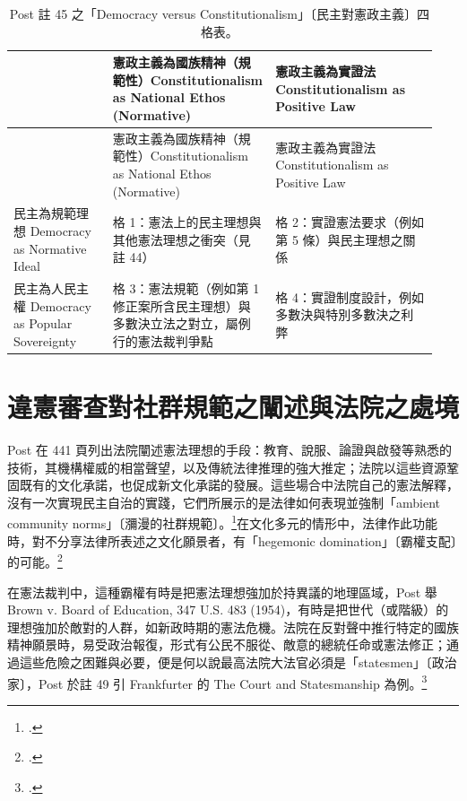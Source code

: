 \begin{longtable}{@{}L{0.22\linewidth}L{0.36\linewidth}L{0.36\linewidth}@{}}
\caption{Post 註 45 之「Democracy versus Constitutionalism」〔民主對憲政主義〕四格表。}\\
\toprule
 & 憲政主義為國族精神（規範性）Constitutionalism as National Ethos (Normative) & 憲政主義為實證法 Constitutionalism as Positive Law \\
\midrule
\endfirsthead
\toprule
 & 憲政主義為國族精神（規範性）Constitutionalism as National Ethos (Normative) & 憲政主義為實證法 Constitutionalism as Positive Law \\
\midrule
\endhead
民主為規範理想 Democracy as Normative Ideal & 格 1：憲法上的民主理想與其他憲法理想之衝突（見註 44） & 格 2：實證憲法要求（例如第 5 條）與民主理想之關係 \\
民主為人民主權 Democracy as Popular Sovereignty & 格 3：憲法規範（例如第 1 修正案所含民主理想）與多數決立法之對立，屬例行的憲法裁判爭點 & 格 4：實證制度設計，例如多數決與特別多數決之利弊 \\
\bottomrule
\end{longtable}

\section{違憲審查對社群規範之闡述與法院之處境}
\label{sec:60_post-8}

Post 在 441 頁列出法院闡述憲法理想的手段：教育、說服、論證與啟發等熟悉的技術，其機構權威的相當聲望，以及傳統法律推理的強大推定；法院以這些資源鞏固既有的文化承諾，也促成新文化承諾的發展。這些場合中法院自己的憲法解釋，沒有一次實現民主自治的實踐，它們所展示的是法律如何表現並強制「ambient community norms」〔瀰漫的社群規範〕。\footcite[441 \& n.46]{post1998}在文化多元的情形中，法律作此功能時，對不分享法律所表述之文化願景者，有「hegemonic domination」〔霸權支配〕的可能。\footcite[441 \& n.47]{post1998}

在憲法裁判中，這種霸權有時是把憲法理想強加於持異議的地理區域，Post 舉 Brown v. Board of Education, 347 U.S. 483 (1954)，有時是把世代（或階級）的理想強加於敵對的人群，如新政時期的憲法危機。法院在反對聲中推行特定的國族精神願景時，易受政治報復，形式有公民不服從、敵意的總統任命或憲法修正；通過這些危險之困難與必要，便是何以說最高法院大法官必須是「statesmen」〔政治家〕，Post 於註 49 引 Frankfurter 的 The Court and Statesmanship 為例。\footcite[442 \& nn.48--49]{post1998}

